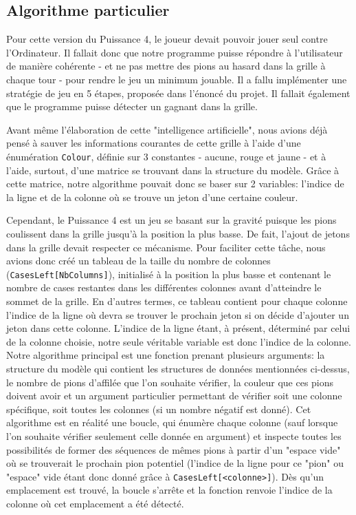 \documentclass[a4paper, 11pt, oneside]{article}
\begin{document}
\subsection{Algorithme particulier}
Pour cette version du Puissance 4, le joueur devait pouvoir jouer seul contre l'Ordinateur.
Il fallait donc que notre programme puisse répondre à l'utilisateur de manière cohérente - et ne pas mettre des pions au hasard dans la grille à chaque tour - pour rendre le
jeu un minimum jouable. Il a fallu implémenter une stratégie de jeu en 5 étapes, proposée dans l'énoncé du projet. Il fallait également que le programme puisse détecter un gagnant dans la grille.

Avant même l'élaboration de cette "intelligence artificielle", nous avions déjà pensé à sauver les informations courantes de cette grille à l'aide d'une énumération \texttt{Colour}, définie sur 3 constantes - aucune, rouge et jaune - et à l'aide, surtout, d'une matrice se trouvant dans la structure du modèle. Grâce à cette matrice, notre algorithme pouvait donc se baser sur 2 variables: l'indice de la ligne et de la colonne où se trouve un jeton d'une certaine couleur.

Cependant, le Puissance 4 est un jeu se basant sur la gravité puisque les pions coulissent dans la grille jusqu'à la position la plus basse. De fait, l'ajout de jetons dans la grille devait respecter ce mécanisme. Pour faciliter cette tâche, nous avions donc créé un tableau de la taille du nombre de colonnes (\texttt{CasesLeft[NbColumns]}), initialisé à la position la plus basse et contenant le nombre de cases restantes dans les différentes colonnes avant d'atteindre le sommet de la grille. En d'autres termes, ce tableau contient pour chaque colonne l'indice de la ligne où devra se trouver le prochain jeton si on décide d'ajouter un jeton dans cette colonne. L'indice de la ligne étant, à présent, déterminé par celui de la colonne choisie, notre seule véritable variable est donc l'indice de la colonne.\\


Notre algorithme principal est une fonction prenant plusieurs arguments: la structure du modèle qui contient les structures de données mentionnées ci-dessus, le nombre de pions d'affilée que l'on souhaite vérifier, la couleur que ces pions doivent avoir et un argument particulier permettant de vérifier soit une colonne spécifique, soit toutes les colonnes (si un nombre négatif est donné). Cet algorithme est en réalité une boucle, qui énumère chaque colonne (sauf lorsque l'on souhaite vérifier seulement celle donnée en argument) et inspecte toutes les possibilités de former des séquences de mêmes pions à partir d'un "espace vide" où se trouverait le prochain pion potentiel (l'indice de la ligne pour ce "pion" ou "espace" vide étant donc donné grâce à \texttt{CasesLeft[<colonne>]}). Dès qu'un emplacement est trouvé, la boucle s'arrête et la fonction renvoie l'indice de la colonne où cet emplacement a été détecté.
\end{document}
